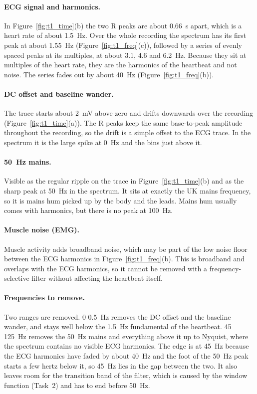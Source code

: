 \documentclass[11pt,a4paper]{article}
\newcommand{\rng}[2]{#1\,\textendash\,#2}
\newcommand{\fix}[1]{#1}
\begin{document}
\paragraph{ECG signal and harmonics.}
In Figure~\ref{fig:t1_time}(b) the two R peaks are about \SI{0.66}{\second} apart, which is a heart rate of about \SI{1.5}{\hertz}.
\fix{Over the whole recording the spectrum has its first peak at about \SI{1.55}{\hertz} (Figure~\ref{fig:t1_freq}(c)), followed by a series of evenly spaced peaks at its multiples, at about \SI{3.1}{}, \SI{4.6}{} and \SI{6.2}{\hertz}.}
Because they sit at multiples of the heart rate, they are the harmonics of the heartbeat and not noise.
The series fades out by about \SI{40}{\hertz} (Figure~\ref{fig:t1_freq}(b)).

\paragraph{DC offset and baseline wander.} The trace starts about \SI{2}{\milli\volt} above zero and drifts downwards over the recording (Figure~\ref{fig:t1_time}(a)).
The R peaks keep the same base-to-peak amplitude throughout the recording, so the drift is a simple offset to the ECG trace.
In the spectrum it is the large spike at \SI{0}{\hertz} and the bins just above it.
\paragraph{\SI{50}{\hertz} mains.} Visible as the regular ripple on the trace in Figure~\ref{fig:t1_time}(b) and as the sharp peak at \SI{50}{\hertz} in the spectrum.
\fix{It sits at exactly the UK mains frequency, so it is mains hum picked up by the body and the leads.
Mains hum usually comes with harmonics, but there is no peak at \SI{100}{\hertz}.}

\paragraph{Muscle noise (EMG).} Muscle activity adds broadband noise, which may be part of the low noise floor between the ECG harmonics in Figure~\ref{fig:t1_freq}(b).
This is broadband and overlaps with the ECG harmonics, so it cannot be removed with a frequency-selective filter without affecting the heartbeat itself.

\paragraph{Frequencies to remove.}
Two ranges are removed.
\rng{0}{\SI{0.5}{\hertz}} removes the DC offset and the baseline wander, and stays well below the \SI{1.5}{\hertz} fundamental of the heartbeat.
\rng{45}{\SI{125}{\hertz}} removes the \SI{50}{\hertz} mains and everything above it up to Nyquist, where the spectrum contains no visible ECG harmonics.
The edge is at \SI{45}{\hertz} because the ECG harmonics have faded by about \SI{40}{\hertz} and the foot of the \SI{50}{\hertz} peak starts a few hertz below it, so \SI{45}{\hertz} lies in the gap between the two.
It also leaves room for the transition band of the filter, which is caused by the window function (Task~2) and has to end before \SI{50}{\hertz}.
\end{document}
